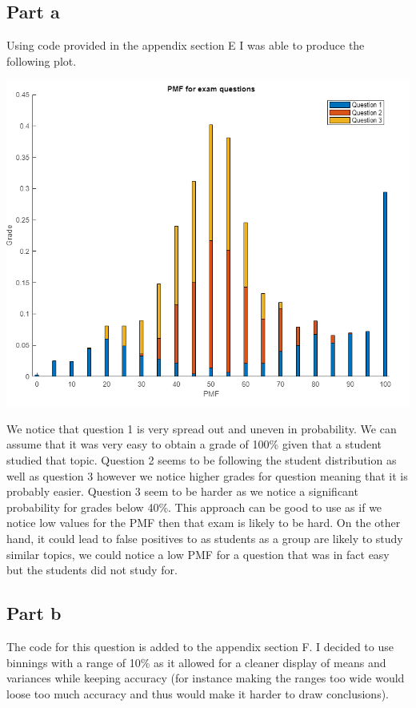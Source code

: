 \documentclass[10pt]{article}
\begin{document}
\subsection*{Part a}
Using code provided in the appendix section E I was able to produce the following
plot.  
\begin{center}
    \includegraphics[scale=0.4]{final_pmf}
\end{center}
We notice that question 1 is very spread out and uneven in probability. We can
assume that it was very easy to obtain a grade of 100\% given that a student studied that topic.
Question 2 seems to be following the student distribution as well as question 3 however we notice
higher grades for question meaning that it is probably easier. Question 3 seem to be harder as we notice
a significant probability for grades below 40\%.
This approach can be good to use as if we notice low values for the PMF then that exam is likely to be hard.
On the other hand, it could lead to false positives to as students as a group are likely to study
similar topics, we could notice a low PMF for a question that was in fact easy but the students did not
study for.


\subsection*{Part b}
The code for this question is added to the appendix section F. I decided to use binnings
with a range of 10\% as it allowed for a cleaner display of means and variances while keeping 
accuracy (for instance making the ranges too wide would loose too much accuracy and thus would 
make it harder to draw conclusions).
\end{document}
